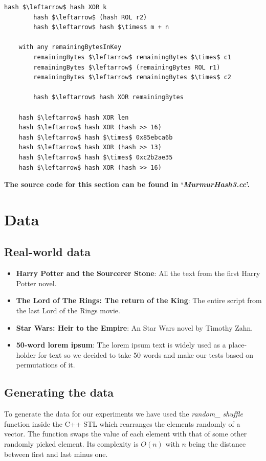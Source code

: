 \documentclass[12pt]{article}
\begin{document}
{\begin{lstlisting}[mathescape=true]
        hash $\leftarrow$ hash XOR k
        hash $\leftarrow$ (hash ROL r2)
        hash $\leftarrow$ hash $\times$ m + n

    with any remainingBytesInKey
        remainingBytes $\leftarrow$ remainingBytes $\times$ c1
        remainingBytes $\leftarrow$ (remainingBytes ROL r1)
        remainingBytes $\leftarrow$ remainingBytes $\times$ c2

        hash $\leftarrow$ hash XOR remainingBytes
 
    hash $\leftarrow$ hash XOR len
    hash $\leftarrow$ hash XOR (hash >> 16)
    hash $\leftarrow$ hash $\times$ 0x85ebca6b
    hash $\leftarrow$ hash XOR (hash >> 13)
    hash $\leftarrow$ hash $\times$ 0xc2b2ae35
    hash $\leftarrow$ hash XOR (hash >> 16)

\end{lstlisting}

\textbf{The source code for this section can be found in `\textit{MurmurHash3.cc}'.}
\bigskip

\section{Data} %

\subsection{Real-world data}
\begin{itemize}
\item \textbf{Harry Potter and the Sourcerer Stone}: All the text from the first Harry Potter novel.
\item \textbf{The Lord of The Rings: The return of the King}: The entire script from the last Lord of the Rings movie.
\item \textbf{Star Wars: Heir to the Empire}:  An Star Wars novel by Timothy Zahn. 
\item \textbf{50-word lorem ipsum}: The lorem ipsum text is widely used as a place-holder for text so we decided to take 50 words and make our tests based on permutations of it.
\end{itemize}

\subsection{Generating the data} \label{generatingData}

To generate the data for our experiments we have used the \textit{random\_ shuffle} function inside the C++ STL which rearranges the elements randomly of a vector. The function swaps the value of each element with that of some other randomly picked element. Its complexity is $O(n)$ with $n$ being  the distance between first and last minus one.\\

}
\end{document}

